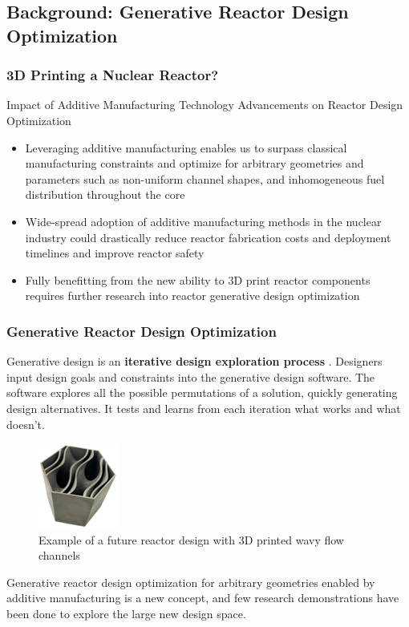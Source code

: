\subsection{Background: Generative Reactor Design Optimization}
\begin{frame}
    \frametitle{3D Printing a Nuclear Reactor?}
    \begin{block}{Impact of Additive Manufacturing Technology Advancements on 
        Reactor Design Optimization}
        \begin{itemize}
            \item Leveraging additive manufacturing enables us to surpass classical 
            manufacturing constraints and optimize for arbitrary geometries and parameters 
            such as non-uniform channel shapes, and inhomogeneous fuel distribution 
            throughout the core
            \item Wide-spread adoption of additive manufacturing methods in the nuclear industry 
            could drastically reduce reactor fabrication costs and deployment timelines 
            and improve reactor safety
            \item Fully benefitting from the new ability to 3D print reactor components 
            requires further research into reactor generative design optimization
          \end{itemize}
    \end{block}
  \end{frame}

  \begin{frame}
    \frametitle{Generative Reactor Design Optimization}
    Generative design is an \textbf{iterative design exploration process} \cite{autodesk_autodesk_2020}. 
    Designers input design goals and constraints into the generative design software. 
    The software explores all the possible permutations of a solution, quickly generating 
    design alternatives. 
    It tests and learns from each iteration what works and what doesn't.

    \begin{figure}[]
        \includegraphics[width=0.2\linewidth]{figures/wavy-channels.png}
        \caption{Example of a future reactor design with 3D printed wavy flow channels}
    \end{figure}

    Generative reactor design optimization for arbitrary geometries enabled by additive 
    manufacturing is a new concept, and few research demonstrations have been done to 
    explore the large new design space.

  \end{frame}

